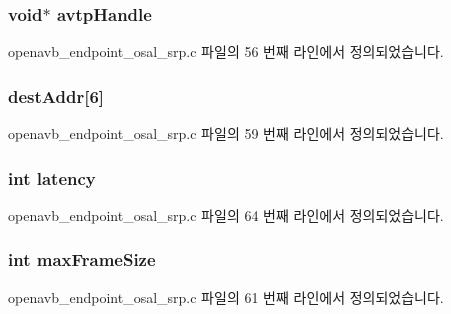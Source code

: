 \subsubsection[{\texorpdfstring{avtp\+Handle}{avtpHandle}}]{\setlength{\rightskip}{0pt plus 5cm}void$\ast$ avtp\+Handle}\hypertarget{structstr_elem__t_a4b9351eb0c3d027b65d2babae355d2c1}{}\label{structstr_elem__t_a4b9351eb0c3d027b65d2babae355d2c1}


openavb\+\_\+endpoint\+\_\+osal\+\_\+srp.\+c 파일의 56 번째 라인에서 정의되었습니다.

\subsubsection[{\texorpdfstring{dest\+Addr}{destAddr}}]{ dest\+Addr\mbox{[}6\mbox{]}}\hypertarget{structstr_elem__t_a1bedd6e7cd5639e606b06cd7103eee6a}{}\label{structstr_elem__t_a1bedd6e7cd5639e606b06cd7103eee6a}


openavb\+\_\+endpoint\+\_\+osal\+\_\+srp.\+c 파일의 59 번째 라인에서 정의되었습니다.

\subsubsection[{\texorpdfstring{latency}{latency}}]{\setlength{\rightskip}{0pt plus 5cm}int latency}\hypertarget{structstr_elem__t_a9c5bf07170b5d91cfb44d4bfd0517128}{}\label{structstr_elem__t_a9c5bf07170b5d91cfb44d4bfd0517128}


openavb\+\_\+endpoint\+\_\+osal\+\_\+srp.\+c 파일의 64 번째 라인에서 정의되었습니다.

\subsubsection[{\texorpdfstring{max\+Frame\+Size}{maxFrameSize}}]{\setlength{\rightskip}{0pt plus 5cm}int max\+Frame\+Size}\hypertarget{structstr_elem__t_ac32e324cfed1a8889e1aad9ca573806e}{}\label{structstr_elem__t_ac32e324cfed1a8889e1aad9ca573806e}


openavb\+\_\+endpoint\+\_\+osal\+\_\+srp.\+c 파일의 61 번째 라인에서 정의되었습니다.

